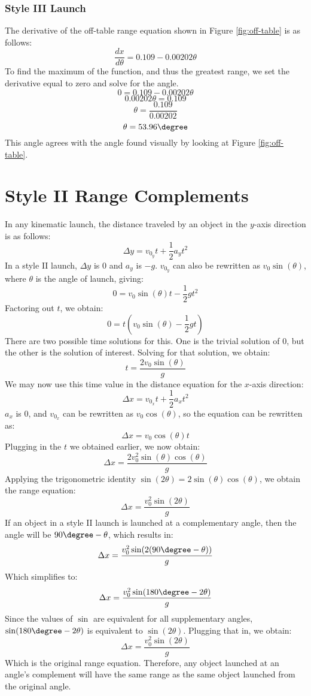 \documentclass{article}
\begin{document}
\subsubsection*{Style III Launch}
The derivative of the off-table range equation shown in Figure \ref{fig:off-table} is as follows:
\[\frac{dx}{d\theta} = 0.109 - 0.00202\theta\]
To find the maximum of the function, and thus the greatest range, we set the derivative equal to zero and solve for the angle.
\[0 = 0.109 - 0.00202\theta\]
\[0.00202\theta = 0.109\]
\[\theta = \frac{0.109}{0.00202}\]
\[\theta = 53.96\degree\]
This angle agrees with the angle found visually by looking at Figure \ref{fig:off-table}.

\section{Style II Range Complements}
In any kinematic launch, the distance traveled by an object in the $y$-axis direction is as follows:
\[\Delta y = v_{0_y}t + \frac{1}{2}a_yt^2\]
In a style II launch, $\Delta y$ is 0 and $a_y$ is $-g$. $v_{0_y}$ can also be rewritten as $v_0\sin(\theta)$, where $\theta$ is the angle of launch, giving:
\[0 = v_0\sin(\theta)t - \frac{1}{2}gt^2\]
Factoring out $t$, we obtain:
\[0 = t(v_0\sin(\theta) - \frac{1}{2}gt)\]
There are two possible time solutions for this. One is the trivial solution of 0, but the other is the solution of interest. Solving for that solution, we obtain:
\[t = \frac{2v_0\sin(\theta)}{g}\]
We may now use this time value in the distance equation for the $x$-axis direction:
\[\Delta x = v_{0_x}t + \frac{1}{2}a_xt^2\]
$a_x$ is 0, and $v_{0_x}$ can be rewritten as $v_0\cos(\theta)$, so the equation can be rewritten as:
\[\Delta x = v_0\cos(\theta)t\]
Plugging in the $t$ we obtained earlier, we now obtain:
\[\Delta x = \frac{2v_0^2\sin(\theta)\cos(\theta)}{g}\]
Applying the trigonometric identity $\sin(2\theta) = 2\sin(\theta)\cos(\theta)$, we obtain the range equation:
\[\Delta x = \frac{v_0^2\sin(2\theta)}{g}\]
If an object in a style II launch is launched at a complementary angle, then the angle will be $90\degree - \theta$, which results in:
\[\Delta x = \frac{v_0^2\sin(2(90\degree - \theta))}{g}\]
Which simplifies to:
\[\Delta x = \frac{v_0^2\sin(180\degree - 2\theta)}{g}\]
Since the values of $\sin$ are equivalent for all supplementary angles, $\sin(180\degree - 2\theta)$ is equivalent to $\sin(2\theta)$. Plugging that in, we obtain:
\[\Delta x = \frac{v_0^2\sin(2\theta)}{g}\]
Which is the original range equation. Therefore, any object launched at an angle's complement will have the same range as the same object launched from the original angle.
\end{document}
